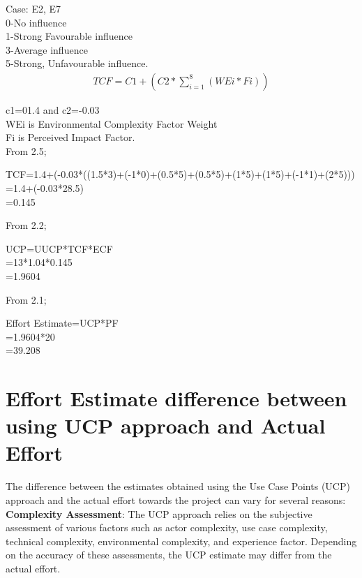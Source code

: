 \documentclass[12pt,letterpaper]{report}
\begin{document}
Case: E2, E7\\
0-No influence\\
1-Strong Favourable influence\\
3-Average influence\\
5-Strong, Unfavourable influence.\\

\begin{align} \label{Environment Complexity Factor}
    TCF=C1+(C2*\sum_{i=1}^{8} (WEi*Fi))
\end{align}

c1=01.4 and c2=-0.03\\
WEi is Environmental Complexity Factor Weight\\
Fi is Perceived Impact Factor.\\

From 2.5;
\begin{center}
    TCF=1.4+(-0.03*((1.5*3)+(-1*0)+(0.5*5)+(0.5*5)+(1*5)+(1*5)+(-1*1)+(2*5)))\\
        =1.4+(-0.03*28.5)\\
        =0.145
\end{center}

From 2.2;
\begin{center}
    UCP=UUCP*TCF*ECF\\
        =13*1.04*0.145\\
        =1.9604
\end{center}

From 2.1;
\begin{center}
    Effort Estimate=UCP*PF\\
        =1.9604*20\\
        =39.208
\end{center}


\section{Effort Estimate difference between using UCP approach and Actual Effort}
The difference between the estimates obtained using the Use Case Points (UCP) approach and the actual effort towards the project can vary for several reasons:\\

\textbf{Complexity Assessment}: The UCP approach relies on the subjective assessment of various factors such as actor complexity, use case complexity, technical complexity, environmental complexity, and experience factor. Depending on the accuracy of these assessments, the UCP estimate may differ from the actual effort.\\
\end{document}
